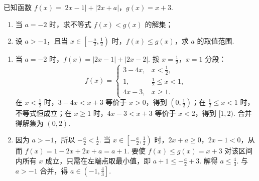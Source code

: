 \begin{problem}
已知函数 \( f(x) = |2x - 1| + |2x + a| \)，\( g(x) = x + 3 \).
\begin{enumerate}
\item 当 \(a = -2\) 时，求不等式 \(f(x) < g(x)\) 的解集；
\item 设 \(a > -1\)，且当 \(x \in \left[-\frac{a}{2}, \frac{1}{2}\right)\) 时，\(f(x) \leqslant g(x)\)，求 \(a\) 的取值范围.
\end{enumerate}
\end{problem}

\begin{solution}
\begin{enumerate}
\item 当 \(a=-2\) 时，\(f(x)=|2x-1|+|2x-2|\). 按 \(x=\frac{1}{2}\)，\(x=1\) 分段：
\[
f(x)=
\begin{cases}
3-4x, & x<\frac{1}{2},\\
1, & \frac{1}{2}\leqslant x<1,\\
4x-3, & x\geqslant1.
\end{cases}
\]
在 \(x<\frac{1}{2}\) 时，\(3-4x<x+3\) 等价于 \(x>0\)，得到 \(\left(0,\frac{1}{2}\right)\)；在 \(\frac{1}{2}\leqslant x<1\) 时，不等式恒成立；在 \(x\geqslant1\) 时，\(4x-3<x+3\) 等价于 \(x<2\)，得到 \([1,2)\). 合并得解集为 \((0,2)\).
\item 因为 \(a>-1\)，所以 \(-\frac{a}{2}<\frac{1}{2}\). 当 \(x\in\left[-\frac{a}{2},\frac{1}{2}\right)\) 时，\(2x+a\geqslant0\)，\(2x-1<0\)，从而 \(f(x)=1-2x+2x+a=a+1\). 要使 \(f(x)\leqslant g(x)=x+3\) 对该区间内所有 \(x\) 成立，只需在左端点取最小值，即
\(\displaystyle a+1\leqslant-\frac{a}{2}+3\). 解得 \(a\leqslant\frac{4}{3}\). 与 \(a>-1\) 合并，得 \(a\in\left(-1,\frac{4}{3}\right]\).
\end{enumerate}
\end{solution}
